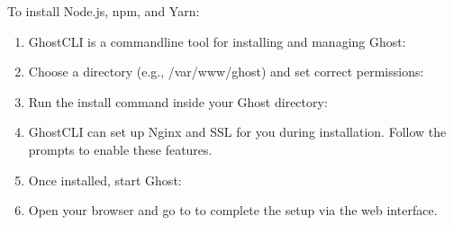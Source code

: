 \documentclass[letterpaper,10pt,english]{sphinxmanual}
\begin{document}
\sphinxAtStartPar
To install Node.js, npm, and Yarn:
\begin{quote}

\sphinxAtStartPar
{}

\sphinxAtStartPar
{}

\sphinxAtStartPar
{}
\end{quote}
\begin{enumerate}
%
\item {} 
\sphinxAtStartPar
{}

\sphinxAtStartPar
Ghost\sphinxhyphen{}CLI is a command\sphinxhyphen{}line tool for installing and managing Ghost:

\sphinxAtStartPar
{}

\item {} 
\sphinxAtStartPar
{}

\sphinxAtStartPar
Choose a directory (e.g., /var/www/ghost) and set correct permissions:

\sphinxAtStartPar
{}

\sphinxAtStartPar
{}

\sphinxAtStartPar
{}

\item {} 
\sphinxAtStartPar
{}

\sphinxAtStartPar
Run the install command inside your Ghost directory:

\sphinxAtStartPar
{}

\item {} 
\sphinxAtStartPar
{}

\sphinxAtStartPar
Ghost\sphinxhyphen{}CLI can set up Nginx and SSL for you during installation. Follow the prompts to enable these features.

\item {} 
\sphinxAtStartPar
{}

\sphinxAtStartPar
Once installed, start Ghost:

\sphinxAtStartPar
{}

\item {} 
\sphinxAtStartPar
{}

\sphinxAtStartPar
Open your browser and go to  to complete the setup via the web interface.

\end{enumerate}
\end{document}
